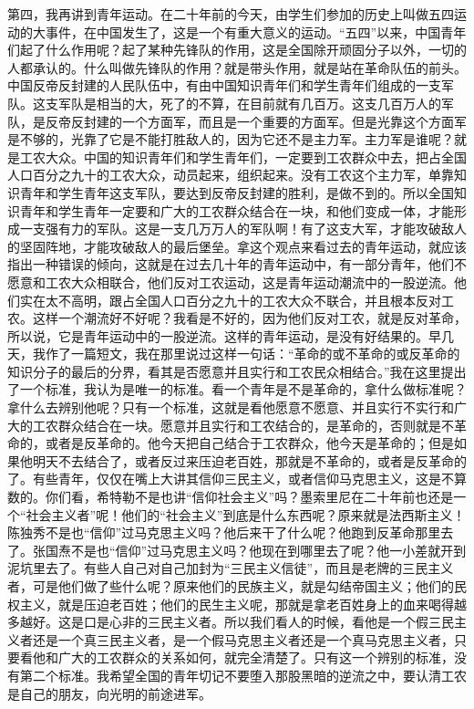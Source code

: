 第四，我再讲到青年运动。在二十年前的今天，由学生们参加的历史上叫做五四运动的大事件，在中国发生了，这是一个有重大意义的运动。“五四”以来，中国青年们起了什么作用呢？起了某种先锋队的作用，这是全国除开顽固分子以外，一切的人都承认的。什么叫做先锋队的作用？就是带头作用，就是站在革命队伍的前头。中国反帝反封建的人民队伍中，有由中国知识青年们和学生青年们组成的一支军队。这支军队是相当的大，死了的不算，在目前就有几百万。这支几百万人的军队，是反帝反封建的一个方面军，而且是一个重要的方面军。但是光靠这个方面军是不够的，光靠了它是不能打胜敌人的，因为它还不是主力军。主力军是谁呢？就是工农大众。中国的知识青年们和学生青年们，一定要到工农群众中去，把占全国人口百分之九十的工农大众，动员起来，组织起来。没有工农这个主力军，单靠知识青年和学生青年这支军队，要达到反帝反封建的胜利，是做不到的。所以全国知识青年和学生青年一定要和广大的工农群众结合在一块，和他们变成一体，才能形成一支强有力的军队。这是一支几万万人的军队啊！有了这支大军，才能攻破敌人的坚固阵地，才能攻破敌人的最后堡垒。拿这个观点来看过去的青年运动，就应该指出一种错误的倾向，这就是在过去几十年的青年运动中，有一部分青年，他们不愿意和工农大众相联合，他们反对工农运动，这是青年运动潮流中的一股逆流。他们实在太不高明，跟占全国人口百分之九十的工农大众不联合，并且根本反对工农。这样一个潮流好不好呢？我看是不好的，因为他们反对工农，就是反对革命，所以说，它是青年运动中的一股逆流。这样的青年运动，是没有好结果的。早几天，我作了一篇短文，我在那里说过这样一句话：“革命的或不革命的或反革命的知识分子的最后的分界，看其是否愿意并且实行和工农民众相结合。”我在这里提出了一个标准，我认为是唯一的标准。看一个青年是不是革命的，拿什么做标准呢？拿什么去辨别他呢？只有一个标准，这就是看他愿意不愿意、并且实行不实行和广大的工农群众结合在一块。愿意并且实行和工农结合的，是革命的，否则就是不革命的，或者是反革命的。他今天把自己结合于工农群众，他今天是革命的；但是如果他明天不去结合了，或者反过来压迫老百姓，那就是不革命的，或者是反革命的了。有些青年，仅仅在嘴上大讲其信仰三民主义，或者信仰马克思主义，这是不算数的。你们看，希特勒不是也讲“信仰社会主义”吗？墨索里尼在二十年前也还是一个“社会主义者”呢！他们的“社会主义”到底是什么东西呢？原来就是法西斯主义！陈独秀不是也“信仰”过马克思主义吗？他后来干了什么呢？他跑到反革命那里去了。张国焘不是也“信仰”过马克思主义吗？他现在到哪里去了呢？他一小差就开到泥坑里去了。有些人自己对自己加封为“三民主义信徒”，而且是老牌的三民主义者，可是他们做了些什么呢？原来他们的民族主义，就是勾结帝国主义；他们的民权主义，就是压迫老百姓；他们的民生主义呢，那就是拿老百姓身上的血来喝得越多越好。这是口是心非的三民主义者。所以我们看人的时候，看他是一个假三民主义者还是一个真三民主义者，是一个假马克思主义者还是一个真马克思主义者，只要看他和广大的工农群众的关系如何，就完全清楚了。只有这一个辨别的标准，没有第二个标准。我希望全国的青年切记不要堕入那股黑暗的逆流之中，要认清工农是自己的朋友，向光明的前途进军。

